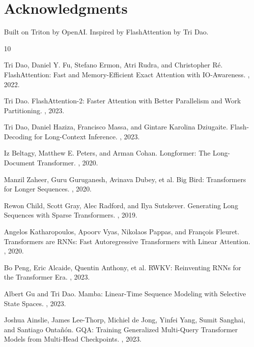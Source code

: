 \documentclass{article}
\begin{document}
    \section*{Acknowledgments}

    Built on Triton by OpenAI. Inspired by FlashAttention by Tri Dao.

    
    \begin{thebibliography}{10}

    Tri Dao, Daniel Y. Fu, Stefano Ermon, Atri Rudra, and Christopher Ré.
    \newblock FlashAttention: Fast and Memory-Efficient Exact Attention with IO-Awareness.
    , 2022.

    Tri Dao.
    \newblock FlashAttention-2: Faster Attention with Better Parallelism and Work Partitioning.
    , 2023.

    Tri Dao, Daniel Haziza, Francisco Massa, and Gintare Karolina Dziugaite.
    \newblock Flash-Decoding for Long-Context Inference.
    , 2023.

    Iz Beltagy, Matthew E. Peters, and Arman Cohan.
    \newblock Longformer: The Long-Document Transformer.
    , 2020.

    Manzil Zaheer, Guru Guruganesh, Avinava Dubey, et al.
    \newblock Big Bird: Transformers for Longer Sequences.
    , 2020.

    Rewon Child, Scott Gray, Alec Radford, and Ilya Sutskever.
    \newblock Generating Long Sequences with Sparse Transformers.
    , 2019.

    Angelos Katharopoulos, Apoorv Vyas, Nikolaos Pappas, and François Fleuret.
    \newblock Transformers are RNNs: Fast Autoregressive Transformers with Linear Attention.
    , 2020.

    Bo Peng, Eric Alcaide, Quentin Anthony, et al.
    \newblock RWKV: Reinventing RNNs for the Transformer Era.
    , 2023.

    Albert Gu and Tri Dao.
    \newblock Mamba: Linear-Time Sequence Modeling with Selective State Spaces.
    , 2023.

    Joshua Ainslie, James Lee-Thorp, Michiel de Jong, Yinfei Yang, Sumit Sanghai, and Santiago Ontañón.
    \newblock GQA: Training Generalized Multi-Query Transformer Models from Multi-Head Checkpoints.
    , 2023.

    \end{thebibliography}

    
\end{document}

